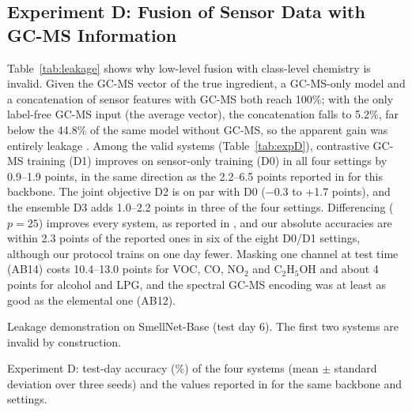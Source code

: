 \subsection{Experiment D: Fusion of Sensor Data with GC-MS Information}
\label{sec:expD}

Table~\ref{tab:leakage} shows why low-level fusion with class-level chemistry is invalid. Given the GC-MS vector of the true ingredient, a GC-MS-only model and a concatenation of sensor features with GC-MS both reach 100\%; with the only label-free GC-MS input (the average vector), the concatenation falls to 5.2\%, far below the 44.8\% of the same model without GC-MS, so the apparent gain was entirely leakage \cite{kaufman2012leakage}. Among the valid systems (Table~\ref{tab:expD}), contrastive GC-MS training (D1) improves on sensor-only training (D0) in all four settings by 0.9--1.9 points, in the same direction as the 2.2--6.5 points reported in \cite{feng2026smellnet} for this backbone. The joint objective D2 is on par with D0 ($-$0.3 to +1.7 points), and the ensemble D3 adds 1.0--2.2 points in three of the four settings. Differencing ($p = 25$) improves every system, as reported in \cite{feng2026smellnet}, and our absolute accuracies are within 2.3 points of the reported ones in six of the eight D0/D1 settings, although our protocol trains on one day fewer. Masking one channel at test time (AB14) costs 10.4--13.0 points for VOC, CO, NO$_2$ and C$_2$H$_5$OH and about 4 points for alcohol and LPG, and the spectral GC-MS encoding was at least as good as the elemental one (AB12).

\begin{table}[!htbp]
\centering
\caption[Leakage demonstration on SmellNet-Base]{Leakage demonstration on SmellNet-Base (test day 6). The first two systems are invalid by construction.}
\label{tab:leakage}
\footnotesize

\end{table}

\begin{table}[!htbp]
\centering
\caption[Experiment D: test-day accuracy of the four systems]{Experiment D: test-day accuracy (\%) of the four systems (mean $\pm$ standard deviation over three seeds) and the values reported in \cite{feng2026smellnet} for the same backbone and settings.}
\label{tab:expD}
\footnotesize
\begin{adjustbox}{max width=\textwidth}

\end{adjustbox}
\end{table}

